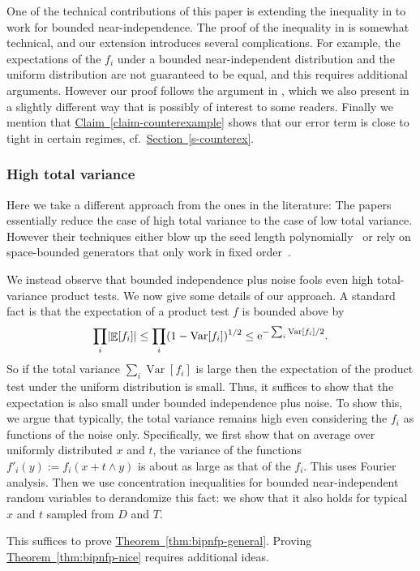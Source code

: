 \documentclass[11pt]{article}
\numberwithin{equation}{section}
\theoremstyle{definition}
\theoremstyle{plain}
\newcommand{\eee}{\mathrm e}
\newcommand{\expref}[2]{\hyperref[#2]{#1~\ref{#2}}}
\DeclarePairedDelimiter{\abs}{\lvert}{\rvert}
\DeclareMathOperator*{\E}{\mathbb{E}}                 %
\DeclareMathOperator*{\Var}{Var}                 %
\begin{document}
%
One of the technical contributions of %
this paper is extending the inequality in \cite{GopalanKM18} to work for
bounded near-independence.  The proof of the inequality in
\cite{GopalanKM18} is somewhat technical, and our extension introduces
several complications.  For example, the expectations of the $f_i$ under
a bounded near-independent distribution and the uniform distribution
are not guaranteed to be equal, and this requires additional arguments.
However our proof follows the argument in \cite{GopalanKM18}, which we
also present in a slightly different way that is possibly of interest to some
readers.
Finally we mention that \expref{Claim}{claim-counterexample} shows
that our error term is close to tight in certain regimes, cf.~\expref{Section}{s-counterex}.

\subsubsection{High total variance}  %
%
Here we take a different approach from the ones in the literature:
The papers~\cite{GavinskyLS12,GopalanKM18} essentially reduce the
case of high total variance to the case of low total variance.
However their techniques either blow up the seed length polynomially~\cite{GavinskyLS12}
%
or rely on space-bounded generators that only work in fixed
order~\cite{GopalanKM18}.

We instead observe that bounded independence plus noise fools even
high total-variance product tests.
We now give some details of our approach.
A standard fact is that the expectation of a product test $f$ is bounded above by
\[
  \prod_i \abs{\E[f_i]}
  \le \prod_i (1 - \Var[f_i])^{1/2}
  \le \eee^{-\sum_i \Var[f_i]/2} .
\]
So if the total variance $\sum_i \Var[f_i]$ is large then the expectation of the product test under the uniform distribution is small.
Thus, it suffices to show that the expectation is also
small under bounded independence plus noise.  To show this, we argue
that typically, the total variance remains high even considering the $f_i$ as
functions of the noise only.  Specifically, we first show that on average
over uniformly distributed $x$ and $t$, the variance of the functions $f'_i(y) := f_i(x + t
\wedge y)$ is about as large as that of the $f_i$.  This uses Fourier
analysis. Then we use concentration inequalities for bounded near-independent random variables to derandomize this fact: we show that it also holds for typical $x$ and $t$ sampled from $D$ and $T$.

This suffices to prove \expref{Theorem}{thm:bipnfp-general}.
Proving \expref{Theorem}{thm:bipnfp-nice} requires additional ideas.
\end{document}
